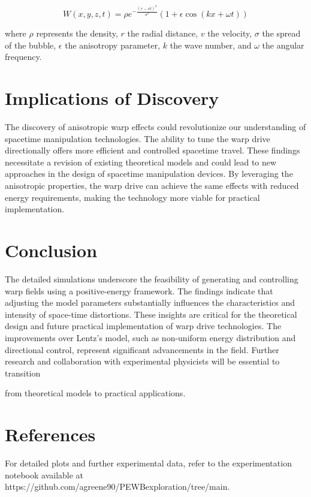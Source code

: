 \documentclass{article}
\begin{document}
\[W(x, y, z, t) = \rho e^{-\frac{(r - vt)^2}{\sigma^2}} (1 + \epsilon \cos(kx + \omega t))\]

where \(\rho\) represents the density, \(r\) the radial distance, \(v\) the velocity, \(\sigma\) the spread of the bubble, \(\epsilon\) the anisotropy parameter, \(k\) the wave number, and \(\omega\) the angular frequency.

\section*{Implications of Discovery}
The discovery of anisotropic warp effects could revolutionize our understanding of spacetime manipulation technologies. The ability to tune the warp drive directionally offers more efficient and controlled spacetime travel. These findings necessitate a revision of existing theoretical models and could lead to new approaches in the design of spacetime manipulation devices. By leveraging the anisotropic properties, the warp drive can achieve the same effects with reduced energy requirements, making the technology more viable for practical implementation.

\section*{Conclusion}
The detailed simulations underscore the feasibility of generating and controlling warp fields using a positive-energy framework. The findings indicate that adjusting the model parameters substantially influences the characteristics and intensity of space-time distortions. These insights are critical for the theoretical design and future practical implementation of warp drive technologies. The improvements over Lentz's model, such as non-uniform energy distribution and directional control, represent significant advancements in the field. Further research and collaboration with experimental physicists will be essential to transition

 from theoretical models to practical applications.

\section*{References}
For detailed plots and further experimental data, refer to the experimentation notebook available at https://github.com/agreene90/PEWBexploration/tree/main.
\end{document}
